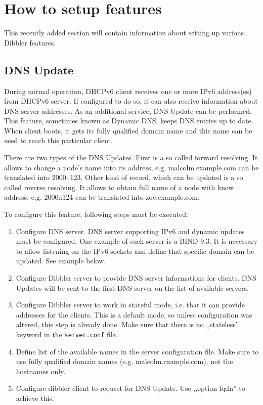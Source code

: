 \section{How to setup features}
This recently added section will contain information about setting up
various Dibbler features.

\subsection{DNS Update}
During normal operation, DHCPv6 client receives one or more IPv6 address(es)
from DHCPv6 server. If configured to do so, it can also receive
information about DNS server addresses. As an additional service, DNS
Update can be performed. This feature, sometimes known as Dynamic DNS,
keeps DNS entries up to date. When client boots, it gets its fully
qualified domain name and this name can be used to reach this
particular client.

There are two types of the DNS Updates. First is a so called forward
resolving. It allows to change a node's name into its address,
e.g. malcolm.example.com can be translated into 2000::123. Other kind
of record, which can be updated is a so called reverse resolving. It
allows to obtain full name of a node with know address, e.g. 2000::124
can be translated into zoe.example.com.

To configure this feature, following steps must be executed:

\begin{enumerate}
\item Configure DNS server. DNS server supporting IPv6 and dynamic
  updates must be configured. One example of such server is a BIND
  9.3. It is necessary to allow listening on the IPv6 sockets and
  define that specific domain can be updated. See example below.
\item Configure Dibbler server to provide DNS server informations for
  clients. DNS Updates will be sent to the first DNS server on the
  list of available servers.
\item Configure Dibbler server to work in stateful mode, i.e. that it
  can provide addresses for the clients. This is a default mode, so
  unless configuration was altered, this step is already done. Make
  sure that there is no ,,stateless'' keyword in the
  \verb+server.conf+ file.
\item Define list of the available names in the server configuration
  file. Make sure to use fully qualified domain names
  (e.g. malcolm.example.com), not the hostnames only. 
\item Configure dibbler client to request for DNS Update. Use ,,option
  fqdn'' to achieve this. 
\end{enumerate}
  
